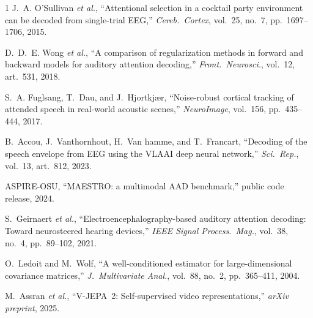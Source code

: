 \documentclass[journal]{IEEEtran}
\begin{document}
\begin{thebibliography}{1}
\small
{}
J.~A. O'Sullivan \emph{et al.}, ``Attentional selection in a cocktail party
environment can be decoded from single-trial EEG,'' \emph{Cereb.\ Cortex},
vol.~25, no.~7, pp.~1697--1706, 2015.

D.~D.~E. Wong \emph{et al.}, ``A comparison of regularization methods in forward and
backward models for auditory attention decoding,'' \emph{Front.\ Neurosci.}, vol.~12,
art.~531, 2018.

S.~A. Fuglsang, T.~Dau, and J.~Hjortkj{\ae}r, ``Noise-robust cortical tracking of
attended speech in real-world acoustic scenes,'' \emph{NeuroImage}, vol.~156,
pp.~435--444, 2017.

B.~Accou, J.~Vanthornhout, H.~Van hamme, and T.~Francart, ``Decoding of the speech
envelope from EEG using the VLAAI deep neural network,'' \emph{Sci.\ Rep.}, vol.~13,
art.~812, 2023.

ASPIRE-OSU, ``MAESTRO: a multimodal AAD benchmark,'' public code release, 2024.

S.~Geirnaert \emph{et al.}, ``Electroencephalography-based auditory attention decoding:
Toward neurosteered hearing devices,'' \emph{IEEE Signal Process.\ Mag.}, vol.~38,
no.~4, pp.~89--102, 2021.

O.~Ledoit and M.~Wolf, ``A well-conditioned estimator for large-dimensional covariance
matrices,'' \emph{J.\ Multivariate Anal.}, vol.~88, no.~2, pp.~365--411, 2004.

M.~Assran \emph{et al.}, ``V-JEPA~2: Self-supervised video representations,''
\emph{arXiv preprint}, 2025.
\end{thebibliography}
\end{document}
